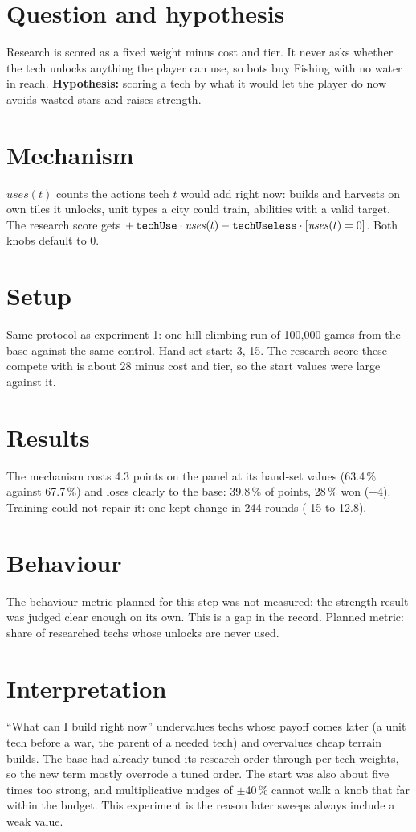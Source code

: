 \documentclass{../polyexp}
\begin{document}

\ExpHeader

\section{Question and hypothesis}
Research is scored as a fixed weight minus cost and tier. It never asks whether the tech unlocks anything the player can use, so bots buy Fishing with no water in reach. \textbf{Hypothesis:} scoring a tech by what it would let the player do now avoids wasted stars and raises strength.

\section{Mechanism}
$\mathit{uses}(t)$ counts the actions tech $t$ would add right now: builds and harvests on own tiles it unlocks, unit types a city could train, abilities with a valid target. The research score gets $+\,\texttt{techUse}\cdot\mathit{uses}(t) - \texttt{techUseless}\cdot[\mathit{uses}(t)=0]$. Both knobs default to 0.

\section{Setup}
Same protocol as experiment 1: one hill-climbing run of 100,000 games from the base against the same control. Hand-set start:  3,  15. The research score these compete with is about 28 minus cost and tier, so the start values were large against it.

\section{Results}
\ExpResults

The mechanism costs 4.3 points on the panel at its hand-set values (63.4\,\% against 67.7\,\%) and loses clearly to the base: 39.8\,\% of points, 28\,\% won ($\pm$4). Training could not repair it: one kept change in 244 rounds ( 15 to 12.8).

\section{Behaviour}
The behaviour metric planned for this step was not measured; the strength result was judged clear enough on its own. This is a gap in the record. Planned metric: share of researched techs whose unlocks are never used.

\section{Interpretation}
``What can I build right now'' undervalues techs whose payoff comes later (a unit tech before a war, the parent of a needed tech) and overvalues cheap terrain builds. The base had already tuned its research order through per-tech weights, so the new term mostly overrode a tuned order. The start was also about five times too strong, and multiplicative nudges of $\pm$40\,\% cannot walk a knob that far within the budget. This experiment is the reason later sweeps always include a weak value.
\end{document}
